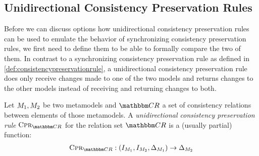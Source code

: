 


\subsection{Unidirectional Consistency Preservation Rules}

Before we can discuss options how unidirectional consistency preservation rules can be used to emulate the behavior of synchronizing consistency preservation rules, we first need to define them to be able to formally compare the two of them.
In contrast to a synchronizing consistency preservation rule as defined in \autoref{def:consistencypreservationrule}, a unidirectional consistency preservation rule does only receive changes made to one of the two models and returns changes to the other models instead of receiving and returning changes to both.

\begin{definition}
    \label{def:unidirectionalconsistencypreservationrule}
    Let $M_{1}, M_{2}$ be two metamodels and $\consistencyrelationset{CR}$ a set of consistency relations between elements of those metamodels.
    A \emph{unidirectional consistency preservation rule} $\consistencypreservationrule{\consistencyrelationset{CR}}$ for the relation set $\consistencyrelationset{CR}$ is a (usually partial) function:
    \begin{align*}
        \consistencypreservationrule{\consistencyrelationset{CR}} : (\metamodelinstanceset{M}{1}, \metamodelinstanceset{M}{2}, \changeuniverse{\metamodel{M}{1}}) \rightarrow \changeuniverse{\metamodel{M}{2}}
    \end{align*}
\end{definition}

